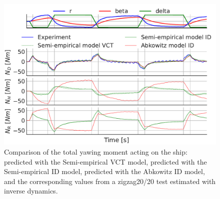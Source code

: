 \begin{figure}[h!]
    \includegraphics[width=\textwidth]{figures/result_ID_regression.ID_regression_ID_N.pdf}
    \caption{Comparison of the total yawing moment acting on the ship: predicted with the Semi-empirical VCT model, predicted with the Semi-empirical ID model, predicted with the Abkowitz ID model, and the corresponding values from a zigzag20/20 test estimated with inverse dynamics.}
    \label{fig:ID_regression_ID_N}
\end{figure}

